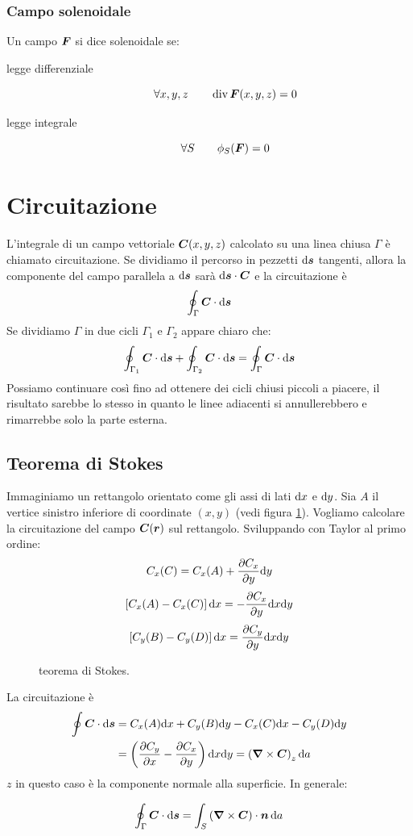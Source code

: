 \subsubsection{Campo solenoidale}
Un campo $\boldsymbol{F}$ si dice solenoidale se:
\begin{description}
  \item[legge differenziale]\[\forall x,y,z\qquad \operatorname{div}\boldsymbol{F}(x,y,z)=0\]
  \item[legge integrale]\[\forall S \qquad\phi_S(\boldsymbol{F})=0\]
\end{description}
\section{Circuitazione}
L'integrale di un campo vettoriale $\boldsymbol{C}(x,y,z)$ calcolato su una linea chiusa $\Gamma$ è chiamato circuitazione. Se dividiamo il percorso in pezzetti $\mathrm{d} \boldsymbol{s}$ tangenti, allora la componente del campo parallela a $\mathrm{d} \boldsymbol{s}$ sarà $\mathrm{d} \boldsymbol{s}\cdot \boldsymbol{C}$ e la circuitazione è
\begin{equation}
  \oint_\Gamma \boldsymbol{C}\cdot\mathrm{d}\boldsymbol{s}
\end{equation}
Se dividiamo  $\Gamma$ in due cicli $\Gamma_1$ e $\Gamma_2$ appare chiaro che:
\[\oint_{\Gamma_1} \boldsymbol{C}\cdot\mathrm{d} \boldsymbol{s}+\oint_{\Gamma_2} \boldsymbol{C}\cdot\mathrm{d}\boldsymbol{s}=\oint_\Gamma\boldsymbol{C}\cdot\mathrm{d}\boldsymbol{s}\]
Possiamo continuare così fino ad ottenere dei cicli chiusi piccoli a piacere, il risultato sarebbe lo stesso in quanto le linee adiacenti si annullerebbero e rimarrebbe solo la parte esterna.
\subsection{Teorema di Stokes}
Immaginiamo un rettangolo orientato come gli assi di lati $\mathrm{d} x$ e $\mathrm{d} y$. Sia $A$ il vertice sinistro inferiore di coordinate $(x,y)$ (vedi figura \ref{stokes_ret}). Vogliamo calcolare la circuitazione del campo $\boldsymbol{C}(\boldsymbol{r})$ sul rettangolo. Sviluppando con Taylor al primo ordine:
\[C_x(C)=C_x(A)+\frac{\partial C_x}{\partial y}\mathrm{d} y\]
\[\left[C_x(A)-C_x(C)\right]\mathrm{d} x=-\frac{\partial C_x}{\partial y}\mathrm{d} x\mathrm{d} y\]
\[\left[C_y(B)-C_y(D)\right]\mathrm{d} x=\frac{\partial C_y}{\partial y}\mathrm{d} x\mathrm{d} y\]
\begin{figure}[htbp]
  \centering
  
  \label{stokes_ret}
  \caption{teorema di Stokes.}
\end{figure}
La circuitazione è
\begin{align*}
  \oint \boldsymbol{C}\cdot\mathrm{d}\boldsymbol{s} & =C_x(A)\mathrm{d} x+C_y(B)\mathrm{d} y-C_x(C)\mathrm{d} x-C_y(D)\mathrm{d} y
  \\
                           & =\left(\frac{\partial C_y}{\partial x}-\frac{\partial C_x}{\partial y}\right)\mathrm{d} x\mathrm{d} y=\left(\boldsymbol{\nabla}\times\boldsymbol{C}\right)_z\mathrm{d} a
\end{align*}
$z$ in questo caso è la componente normale alla superficie. In generale:
\begin{Teo}[Stokes]
  \begin{equation}
    \oint_\Gamma\boldsymbol{C}\cdot\mathrm{d}\boldsymbol{s}=\int_S\left(\boldsymbol{\nabla}\times\boldsymbol{C}\right)\cdot\boldsymbol{n}\,\mathrm{d} a
  \end{equation}
\end{Teo}

